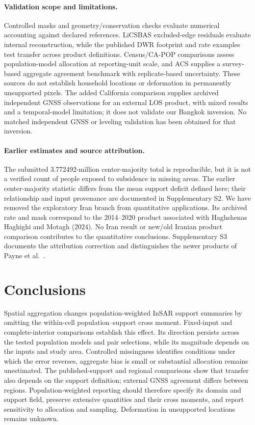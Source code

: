 \documentclass[pdflatex,lineno,sn-nature]{sn-jnl}
\begin{document}
\paragraph{Validation scope and limitations.} Controlled masks and geometry/conservation checks evaluate numerical accounting against declared references. LiCSBAS excluded-edge residuals evaluate internal reconstruction, while the published DWR footprint and rate examples test transfer across product definitions. Census/CA-POP comparisons assess population-model allocation at reporting-unit scale, and ACS supplies a survey-based aggregate agreement benchmark with replicate-based uncertainty. These sources do not establish household locations or deformation in permanently unsupported pixels. The added California comparison supplies archived independent GNSS observations for an external LOS product, with mixed results and a temporal-model limitation; it does not validate our Bangkok inversion. No matched independent GNSS or leveling validation has been obtained for that inversion.



\paragraph{Earlier estimates and source attribution.} The submitted 3.772492-million center-majority total is reproducible, but it is not a verified count of people exposed to subsidence in missing areas. The earlier center-majority statistic differs from the mean support deficit defined here; their relationship and input provenance are documented in Supplementary S2. We have removed the exploratory Iran branch from quantitative applications. Its archived rate and mask correspond to the 2014--2020 product associated with Haghshenas Haghighi and Motagh (2024). No Iran result or new/old Iranian product comparison contributes to the quantitative conclusions. Supplementary S3 documents the attribution correction and distinguishes the newer products of Payne et al.\ \citep{haghshenas2024iran,payne2025iran,payne2024data}.

\section{Conclusions}
Spatial aggregation changes population-weighted InSAR support summaries by omitting the within-cell population--support cross moment. Fixed-input and complete-interior comparisons establish this effect. Its direction persists across the tested population models and pair selections, while its magnitude depends on the inputs and study area. Controlled missingness identifies conditions under which the error reverses, aggregate bias is small or substantial allocation remains unestimated. The published-support and regional comparisons show that transfer also depends on the support definition; external GNSS agreement differs between regions. Population-weighted reporting should therefore specify its domain and support field, preserve extensive quantities and their cross moments, and report sensitivity to allocation and sampling. Deformation in unsupported locations remains unknown.
\end{document}

